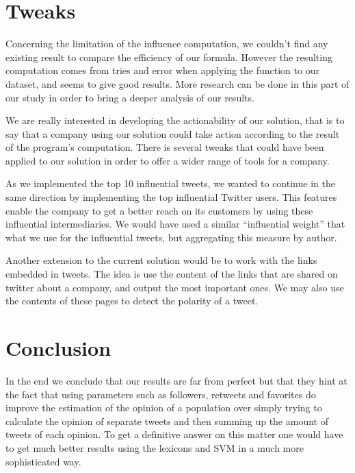 \documentclass[a4paper,12pt]{report}
\begin{document}
\section{Tweaks}

Concerning the limitation of the influence computation, we couldn't find any existing result to compare the efficiency of our formula. However the resulting computation comes from tries and error when applying the function to our dataset, and seems to give good results. More research can be done in this part of our study in order to bring a deeper analysis of our results.

We are really interested in developing the actionability of our solution, that is to say that a company using our solution could take action according to the result of the program’s computation. There is several tweaks that could have been applied to our solution in order to offer a wider range of tools for a company.

As we implemented the top 10 influential tweets, we wanted to continue in the same direction by implementing the top influential Twitter users. This features enable the company to get a better reach on its customers by using these influential intermediaries. We would have used a similar “influential weight” that what we use for the influential tweets, but aggregating this measure by author.

Another extension to the current solution would be to work with the links embedded in tweets. The idea is use the content of the links that are shared on twitter about a company, and output the most important ones. We may also use the contents of these pages to detect the polarity of a tweet.

\section{Conclusion}

In the end we conclude that our results are far from perfect but that they hint at the fact that using parameters such as followers, retweets and favorites do improve the estimation of the opinion of a population over simply trying to calculate the opinion of separate tweets and then summing up the amount of tweets of each opinion.
To get a definitive answer on this matter one would have to get much better results using the lexicons and SVM in a much more sophisticated way.
\end{document}
